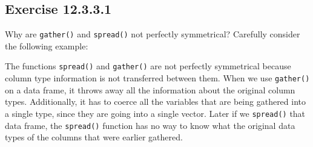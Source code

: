 \documentclass[]{book}
\newenvironment{Shaded}{\begin{snugshade}}{\end{snugshade}}
\newcommand{\CommentTok}[1]{\textcolor[rgb]{0.56,0.35,0.01}{\textit{#1}}}
\newcommand{\DataTypeTok}[1]{\textcolor[rgb]{0.13,0.29,0.53}{#1}}
\newcommand{\DecValTok}[1]{\textcolor[rgb]{0.00,0.00,0.81}{#1}}
\newcommand{\FloatTok}[1]{\textcolor[rgb]{0.00,0.00,0.81}{#1}}
\newcommand{\KeywordTok}[1]{\textcolor[rgb]{0.13,0.29,0.53}{\textbf{#1}}}
\newcommand{\NormalTok}[1]{#1}
\newcommand{\OperatorTok}[1]{\textcolor[rgb]{0.81,0.36,0.00}{\textbf{#1}}}
\newcommand{\StringTok}[1]{\textcolor[rgb]{0.31,0.60,0.02}{#1}}
\theoremstyle{plain}
\theoremstyle{remark}
\begin{document}
\hypertarget{exercise-12.3.3.1}{%
\subsection*{\texorpdfstring{Exercise {12.3.3.1}}{Exercise 12.3.3.1}}\label{exercise-12.3.3.1}}

Why are \texttt{gather()} and \texttt{spread()} not perfectly symmetrical?
Carefully consider the following example:

\begin{Shaded}
\end{Shaded}

The functions \texttt{spread()} and \texttt{gather()} are not perfectly symmetrical because column type information is not transferred between them.
When we use \texttt{gather()} on a data frame, it throws away all the information about the original column types.
Additionally, it has to coerce all the variables that are being gathered into
a single type, since they are going into a single vector.
Later if we \texttt{spread()} that data frame, the \texttt{spread()} function has no way to
know what the original data types of the columns that were earlier gathered.
\end{document}

